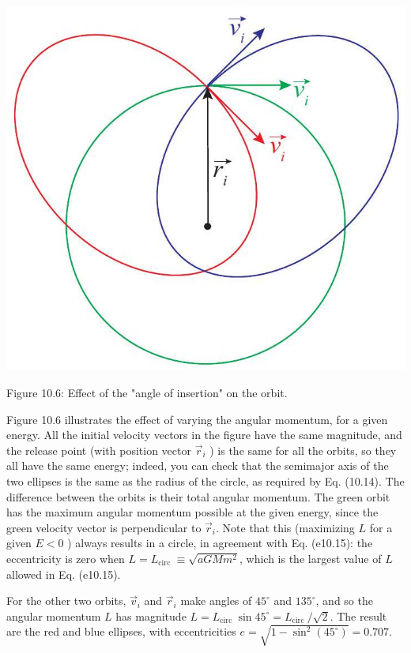 \documentclass[10pt]{article}
\begin{document}
\begin{center}
\includegraphics[max width=\textwidth]{2024_09_14_9969b06773f10b6936e8g-250}
\end{center}

Figure 10.6: Effect of the "angle of insertion" on the orbit.

Figure 10.6 illustrates the effect of varying the angular momentum, for a given energy. All the initial velocity vectors in the figure have the same magnitude, and the release point (with position vector $\vec{r}_{i}$ ) is the same for all the orbits, so they all have the same energy; indeed, you can check that the semimajor axis of the two ellipses is the same as the radius of the circle, as required by Eq. (10.14). The difference between the orbits is their total angular momentum. The green orbit has the maximum angular momentum possible at the given energy, since the green velocity vector is perpendicular to $\vec{r}_{i}$. Note that this (maximizing $L$ for a given $E<0$ ) always results in a circle, in agreement with Eq. (e10.15): the eccentricity is zero when $L=L_{\text {circ }} \equiv \sqrt{a G M m^{2}}$, which is the largest value of $L$ allowed in Eq. (e10.15).

For the other two orbits, $\vec{v}_{i}$ and $\vec{r}_{i}$ make angles of $45^{\circ}$ and $135^{\circ}$, and so the angular momentum $L$ has magnitude $L=L_{\text {circ }} \sin 45^{\circ}=L_{\text {circ }} / \sqrt{2}$. The result are the red and blue ellipses, with eccentricities $e=\sqrt{1-\sin ^{2}\left(45^{\circ}\right)}=0.707$.
\end{document}
